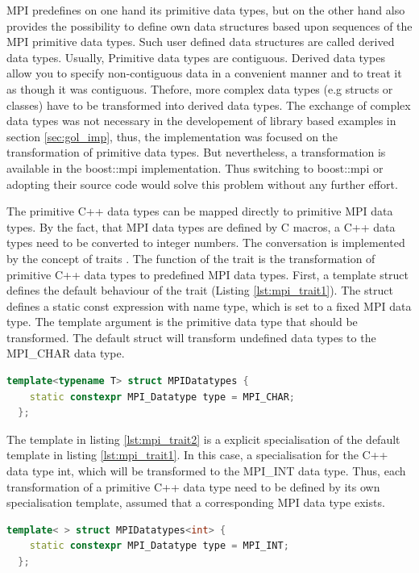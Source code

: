 MPI predefines on one hand its primitive data types, but on the other
hand also provides the possibility to define own data structures based
upon sequences of the MPI primitive data types. Such user defined data
structures are called derived data types. Usually, Primitive data
types are contiguous. Derived data types allow you to specify
non-contiguous data in a convenient manner and to treat it as though
it was contiguous.  Thefore, more complex data types (e.g structs or
classes) have to be transformed into derived data types. The exchange
of complex data types was not necessary in the developement of library
based examples in section \ref{sec:gol_imp}, thus, the implementation
was focused on the transformation of primitive data types.  But
nevertheless, a transformation is available in the boost::mpi
implementation. Thus switching to boost::mpi \cite{ref:boost::mpi} or
adopting their source code would solve this problem without any
further effort.

The primitive C++ data types can be mapped directly to primitive MPI
data types. By the fact, that MPI data types are defined by C macros,
a C++ data types need to be converted to integer numbers. The
conversation is implemented by the concept of traits \cite{ref:trait}.
The function of the trait is the transformation of primitive C++ data
types to predefined MPI data types.  First, a template struct defines
the default behaviour of the trait (Listing \ref{lst:mpi_trait1}). The
struct defines a static const expression with name type, which is set
to a fixed MPI data type. The template argument is the primitive data
type that should be transformed. The default struct will transform
undefined data types to the MPI\_CHAR data type.

\begin{lstlisting}[language=C++, label=lst:mpi_trait1]
  template<typename T> struct MPIDatatypes { 
    static constexpr MPI_Datatype type = MPI_CHAR; 
  };
\end{lstlisting}

The template in listing \ref{lst:mpi_trait2} is a explicit
specialisation of the default template in listing
\ref{lst:mpi_trait1}. In this case, a specialisation for the C++ data
type int, which will be transformed to the MPI\_INT data type.  Thus,
each transformation of a primitive C++ data type need to be defined
by its own specialisation template, assumed that a corresponding
MPI data type exists.

\begin{lstlisting}[language=C++, label=lst:mpi_trait2]
  template< > struct MPIDatatypes<int> { 
    static constexpr MPI_Datatype type = MPI_INT; 
  };
\end{lstlisting}

